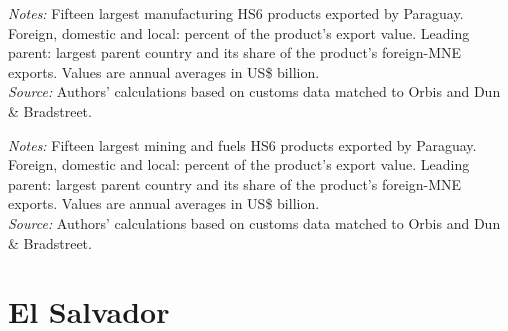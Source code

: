 \documentclass[11pt,a4paper]{article}
\begin{document}
\begin{table}[H]\centering\footnotesize%
  \caption{Paraguay, Manufacturing: Fifteen Largest Export Products}%
  \label{tab:c_hs6_PRY_manufacturing}%
  \par\vspace{3pt}%
  \begin{minipage}{0.95\textwidth}\footnotesize %
  \textit{Notes:} Fifteen largest manufacturing HS6 products exported by Paraguay. Foreign, domestic and local: percent of the product's export value. Leading parent: largest parent country and its share of the product's foreign-MNE exports. Values are annual averages in US\$ billion.\\[3pt]%
  \textit{Source:} Authors' calculations based on customs data matched to Orbis and Dun \& Bradstreet.%
  \end{minipage}%
  \end{table}
\begin{table}[H]\centering\footnotesize%
  \caption{Paraguay, Mining and Fuels: Fifteen Largest Export Products}%
  \label{tab:c_hs6_PRY_mining}%
  \par\vspace{3pt}%
  \begin{minipage}{0.95\textwidth}\footnotesize %
  \textit{Notes:} Fifteen largest mining and fuels HS6 products exported by Paraguay. Foreign, domestic and local: percent of the product's export value. Leading parent: largest parent country and its share of the product's foreign-MNE exports. Values are annual averages in US\$ billion.\\[3pt]%
  \textit{Source:} Authors' calculations based on customs data matched to Orbis and Dun \& Bradstreet.%
  \end{minipage}%
  \end{table}

\section{El Salvador}\label{sec:c_SLV}
\end{document}
